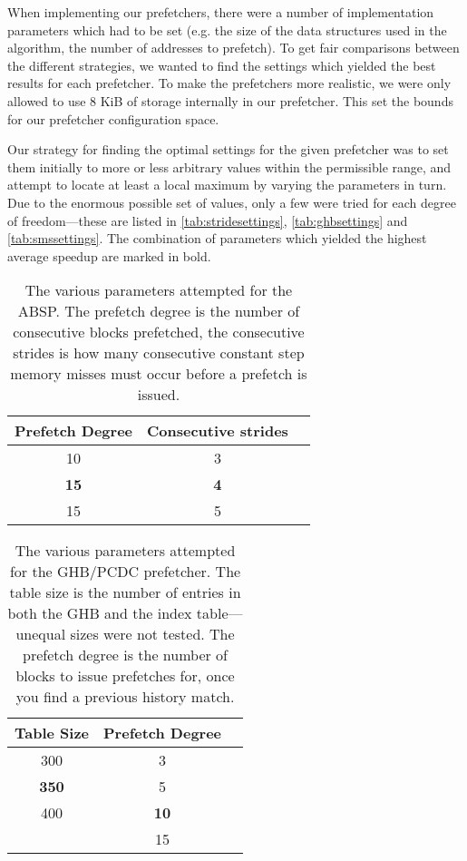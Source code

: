 When implementing our prefetchers, there were a number of
implementation parameters which had to be set (e.g. the size of the
data structures used in the algorithm, the number of addresses to
prefetch). To get fair comparisons between the different strategies,
we wanted to find the settings which yielded the best results for each
prefetcher. To make the prefetchers more realistic, we were only
allowed to use 8 KiB of storage internally in our prefetcher. This set
the bounds for our prefetcher configuration space. 

Our strategy for finding the optimal settings for the given prefetcher
was to set them initially to more or less arbitrary values within the
permissible range, and attempt to locate at least a local maximum by
varying the parameters in turn. Due to the enormous possible set of
values, only a few were tried for each degree of freedom---these are
listed in \autoref{tab:stridesettings}, \autoref{tab:ghbsettings} and
\autoref{tab:smssettings}. The
combination of parameters which yielded the highest average speedup
are marked in bold.

\begin{table}[htbp]
  \centering
  \begin{tabular}{|c|c|c|}
    \hline
    \textbf{Prefetch Degree} & \textbf{Consecutive strides} \\ \hline
    10 & 3 \\ \hline
    \textbf{15} & \textbf{4} \\ \hline
    15 & 5 \\ \hline %
  \end{tabular}
  \caption{The various parameters attempted for the ABSP. The prefetch degree is the number of consecutive blocks prefetched, the consecutive strides is how many consecutive constant step memory misses must occur before a prefetch is issued.}
  \label{tab:stridesettings}
\end{table}

\begin{table}[htbp]
  \centering
  \begin{tabular}{|c|c|c|}
    \hline
    \textbf{Table Size} & \textbf{Prefetch Degree} \\ \hline
    300 & 3 \\ \hline
    \textbf{350} & 5 \\ \hline
    400 & \textbf{10} \\ \hline
        & 15 \\ \hline
  \end{tabular}
  \caption{The various parameters attempted for the GHB/PCDC prefetcher. The table size is the number of entries in both the GHB and the index table---unequal sizes were not tested. The prefetch degree is the number of blocks to issue prefetches for, once you find a previous history match.}
  \label{tab:ghbsettings}
\end{table}


